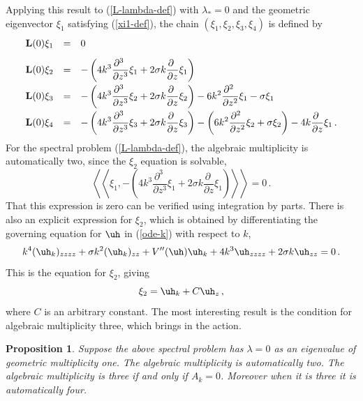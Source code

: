 \documentclass[10pt]{article}
\newtheorem{prop}[thm]{Proposition}
\begin{document}
\noindent Applying this result to (\ref{L-lambda-def}) with $\lambda_*=0$ and
the geometric eigenvector $\xi_1$ satisfying (\ref{xi1-def}), the chain
$(\xi_1,\xi_2,\xi_3,\xi_4)$ is defined by
%
\begin{equation}\label{chain-4}
\begin{array}{rcl}
{\bf L}(0)\xi_1 &=&\displaystyle 0\\[3mm]
{\bf L}(0)\xi_2 &=&\displaystyle -\left( 4k^3 \frac{\partial^3\ }{\partial z^3}\xi_1
 + 2\sigma k \frac{\partial\ }{\partial z}\xi_1\right)\\[3mm]
{\bf L}(0)\xi_3 &=&\displaystyle -\left( 4k^3 \frac{\partial^3\ }{\partial z^3}\xi_2
 + 2\sigma k \frac{\partial\ }{\partial z}\xi_2\right) -
6k^2\frac{\partial^2\ }{\partial z^2}\xi_1 - \sigma\xi_1\\[3mm]
{\bf L}(0)\xi_4 &=&\displaystyle -\left( 4k^3 \frac{\partial^3\ }{\partial z^3}\xi_3
 + 2\sigma k \frac{\partial\ }{\partial z}\xi_3\right) -
\left( 6k^2\frac{\partial^2\ }{\partial z^2}\xi_2 + \sigma\xi_2\right)
 - 4k \frac{\partial\ }{\partial z}\xi_1\,.
\end{array}
\end{equation}
%
For the spectral problem (\ref{L-lambda-def}), the algebraic multiplicity is automatically two, since the $\xi_2$ equation is
solvable,
\[
\left\langle\!\left\langle\xi_1,-\left( 4k^3 \frac{\partial^3\ }{\partial z^3}\xi_1
 + 2\sigma k \frac{\partial\ }{\partial z}\xi_1\right)
\right\rangle\!\right\rangle =0\,.
\]
That this expression is zero can be verified using integration by parts.  There
is also an explicit expression for $\xi_2$, which is obtained by differentiating
the governing equation for $\uh$ in (\ref{ode-k}) with respect to $k$,
%
\begin{equation}\label{ode-k-SH}
  k^4 (\uh_k)_{zzzz} + \sigma k^2 (\uh_k)_{zz} + V''(\uh)\uh_k
  + 4k^3 \uh_{zzzz} + 2\sigma k \uh_{zz}  = 0 \,.
\end{equation}
%
This is the equation for $\xi_2$, giving
\[
\xi_2 = \uh_k + C \uh_z\,,
\]
where $C$ is an arbitrary constant.  The most interesting result is the
condition for algebraic multiplicity three, which brings in the action.
\vspace{.15cm}

\begin{prop} {\it Suppose the above spectral problem has
$\lambda=0$ as an eigenvalue of geometric multiplicity one. The algebraic
multiplicity is automatically two. The algebraic multiplicity is three if and
only if $A_k=0$. Moreover when it is three it is automatically four.}
\end{prop}
\end{document}

